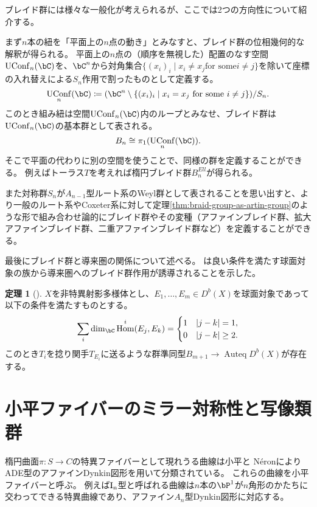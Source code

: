 \documentclass[uplatex,11pt,a4paper,dvipdfmx]{jsarticle}
\numberwithin{equation}{section}
\theoremstyle{definition}
\newtheorem{theorem}{定理}[section]
\DeclareMathOperator{\Hom}{\mathrm{Hom}}
\DeclareMathOperator{\Auteq}{\mathrm{Auteq}}
\DeclareMathOperator{\UConf}{UConf}
\begin{document}
ブレイド群には様々な一般化が考えられるが、ここでは2つの方向性について紹介する。

まず$n$本の紐を「平面上の$n$点の動き」とみなすと、ブレイド群の位相幾何的な解釈が得られる。
平面上の$n$点の（順序を無視した）配置のなす空間$\UConf_n(\bC)$を、$\bC^n$から対角集合$\{(x_i)_i \mid x_i \neq x_j \text{for some} i \neq j\}$を除いて座標の入れ替えによる$S_n$作用で割ったものとして定義する。
\begin{equation}
    \UConf_n(\bC) \coloneq (\bC^n \setminus \{(x_i)_i \mid x_i = x_j \text{ for some } i \neq j\}) / S_n.
\end{equation}
このとき組み紐は空間$\UConf_n(\bC)$内のループとみなせ、ブレイド群は$\UConf_n(\bC)$の基本群として表される。
\begin{equation}
    B_n \cong \pi_1(\UConf_n(\bC)).
\end{equation}
そこで平面の代わりに別の空間を使うことで、同様の群を定義することができる。
例えばトーラス$T$を考えれば楕円ブレイド群$B^{Ell}_n$が得られる。

また対称群$S_n$が$A_{n-1}$型ルート系のWeyl群として表されることを思い出すと、より一般のルート系やCoxeter系に対して定理\ref{thm:braid-group-as-artin-group}のような形で組み合わせ論的にブレイド群やその変種（アファインブレイド群、拡大アファインブレイド群、二重アファインブレイド群など）を定義することができる。







最後にブレイド群と導来圏の関係について述べる。
\cite{MR1831820}は良い条件を満たす球面対象の族から導来圏へのブレイド群作用が誘導されることを示した。
\begin{theorem}[\cite{MR1831820}]
    $X$を非特異射影多様体とし、$E_1, \dots, E_m \in D^b(X)$を球面対象であって以下の条件を満たすものとする。
    \begin{equation}
        \sum_i\dim_\bC\Hom^i(E_j, E_k) = \begin{cases}
            1 & |j-k| = 1,    \\
            0 & |j-k| \geq 2.
        \end{cases}
    \end{equation}
    このとき$T_i$を捻り関手$T_{E_i}$に送るような群準同型$B_{m+1} \to \Auteq D^b(X)$が存在する。
\end{theorem}






\section{小平ファイバーのミラー対称性と写像類群}
楕円曲面$\pi \colon S \to C$の特異ファイバーとして現れうる曲線は小平と N\'{e}ronによりADE型のアファインDynkin図形を用いて分類されている。
これらの曲線を小平ファイバーと呼ぶ。
例えば$\rm{I}_n$型と呼ばれる曲線は$n$本の$\bP^1$が$n$角形のかたちに交わってできる特異曲線であり、アファイン$A_n$型Dynkin図形に対応する。
\end{document}
